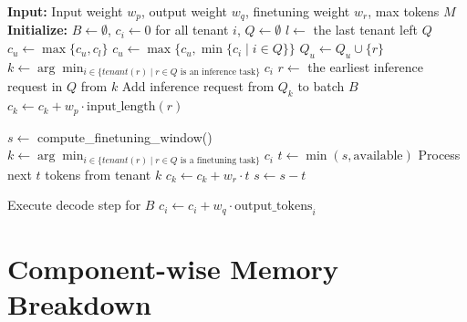 \begin{algorithm}[t]
\caption{FlexLLM with Virtual Token Counter for Fair Co-Serving}
\label{alg:flexllm-vtc}
\begin{algorithmic}[1]
\State \textbf{Input:} Input weight $w_p$, output weight $w_q$, finetuning weight $w_r$, max tokens $M$
\State \textbf{Initialize:} $B \leftarrow \emptyset$, $c_i \leftarrow 0$ for all tenant $i$, $Q \leftarrow \emptyset$
\State
{}
                \State $l \gets$ the last tenant left $Q$
                \State $c_u \gets \max\{c_u, c_l\}$
            \Else
                \State $c_u \gets \max\{c_u, \min\{c_i \mid i \in Q\}\}$
            \EndIf
        \EndIf
        \State $Q_u \leftarrow Q_u \cup \{r\}$
    \EndIf
\EndWhile
\State
{}
            \State $k \leftarrow \arg\min_{i \in \{tenant(r) \mid r \in Q \text{ is an inference task}\}} c_i$
            \State $r \gets$ the earliest inference request in $Q$ from $k$
            \State Add inference request from $Q_k$ to batch $B$
            \State $c_k \leftarrow c_k + w_p \cdot \text{input\_length}(r)$
        \EndWhile
        
        \State $s \leftarrow$ compute\_finetuning\_window()
            \State $k \leftarrow \arg\min_{i \in \{tenant(r) \mid r \in Q \text{ is a finetuning task}\}} c_i$
            \State $t \gets \min(s, \text{available})$
            \State Process next $t$ tokens from tenant $k$
            \State $c_k \gets c_k + w_r \cdot t$
            \State $s \leftarrow s - t$
        \EndWhile
    \EndIf
    
    \State Execute decode step for $B$
        \State $c_i \leftarrow c_i + w_q \cdot \text{output\_tokens}_i$
    \EndFor
\EndWhile
\end{algorithmic}
\end{algorithm}

\section{Component-wise Memory Breakdown}
\label{sec:memory-breakdown-detailed}

